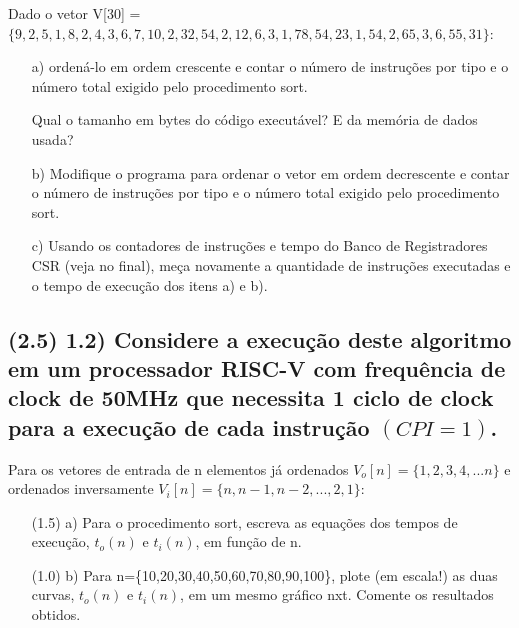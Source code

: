 \documentclass{article}
\begin{document}
Dado o vetor V[30] = $\{9,2,5,1,8,2,4,3,6,7,10,2,32,54,2,12,6,3,1,78,54,23,1,54,2,65,3,6,55,31\}$:

\begin{enumerate}
    \item[a)] ordená-lo em ordem crescente e contar o número de instruções por tipo e o número total exigido pelo procedimento sort.
    \item[] Qual o tamanho em bytes do código executável? E da memória de dados usada?
    \item[b)] Modifique o programa para ordenar o vetor em ordem decrescente e contar o número de instruções por tipo e o número total exigido pelo procedimento sort.
    \item[c)] Usando os contadores de instruções e tempo do Banco de Registradores CSR (veja no final), meça novamente a quantidade de instruções executadas e o tempo de execução dos itens a) e b).
\end{enumerate}

\subsection*{(2.5) 1.2) Considere a execução deste algoritmo em um processador RISC-V com frequência de clock de 50MHz que necessita 1 ciclo de clock para a execução de cada instrução $(CPI=1)$.}
Para os vetores de entrada de n elementos já ordenados $V_{o}[n]=\{1,2,3,4,...n\}$ e ordenados inversamente $V_{i}[n]=\{n,n-1,n-2,...,2,1\}$:
\begin{enumerate}
    \item[(1.5) a)] Para o procedimento sort, escreva as equações dos tempos de execução, $t_{o}(n)$ e $t_{i}(n)$, em função de n.
    \item[(1.0) b)] Para n=\{10,20,30,40,50,60,70,80,90,100\}, plote (em escala!) as duas curvas, $t_{o}(n)$ e $t_{i}(n)$, em um mesmo gráfico nxt. Comente os resultados obtidos.
\end{enumerate}
\end{document}
